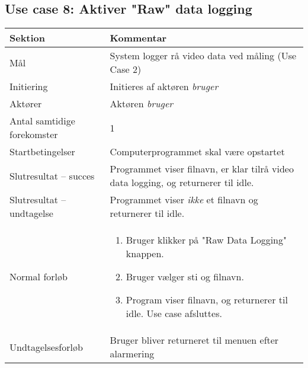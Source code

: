 \documentclass[a4paper,oneside,12pt]{article}
\begin{document}
	\subsection{Use case 8: Aktiver "Raw" data logging}
	\begin{tabular}{|l|p{7.7cm}|}
		\hline \textbf{Sektion} 	& \textbf{Kommentar} \\ 
		\hline Mål  & System logger rå video data ved måling (Use Case 2) \\ 
		\hline Initiering  & Initieres af aktøren \textit{bruger} \\ 
		\hline Aktører & Aktøren \textit{bruger} \\ 
		\hline Antal samtidige forekomster & 1 \\ 
		\hline Startbetingelser & Computerprogrammet skal være opstartet \\ 
		\hline Slutresultat – succes & Programmet viser filnavn, er klar tilrå video data logging, og returnerer til idle. \\ 
		\hline Slutresultat – undtagelse & Programmet viser \textit{ikke} et filnavn og returnerer til idle. \\ 
		\hline Normal forløb & \begin{enumerate}
			\item Bruger klikker på "Raw Data Logging" knappen.
			\item Bruger vælger sti og filnavn.
			\item Program viser filnavn, og returnerer til idle. Use case afsluttes.
		\end{enumerate} \\ 
		\hline Undtagelsesforløb & Bruger bliver returneret til menuen efter alarmering \\ 
		\hline 
	\end{tabular}
	
\end{document}
